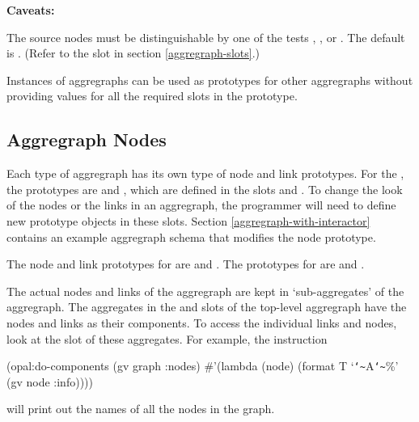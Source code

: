 {\bf Caveats:}

The source nodes must be distinguishable by one of the tests
, , or .  The default is .
(Refer to the  slot in section
\ref{aggregraph-slots}.)

Instances of aggregraphs can be used as prototypes for other aggregraphs
without providing values for all the required slots in the prototype.


\subsection{Aggregraph Nodes}
\label{node-slots}

Each type of aggregraph has its own type of node and link prototypes.  For the
, the prototypes are  and
, which are defined in the slots
 and .  To change the look of the nodes
or the links in an aggregraph, the programmer will need to define new
prototype objects in these slots.  Section \ref{aggregraph-with-interactor}
contains an example aggregraph schema that modifies the node prototype.

The node and link prototypes for  are
 and
.  The prototypes for
 are
 and
.

The actual nodes and links of the aggregraph are kept in `sub-aggregates' of
the aggregraph.  The aggregates in the  and  slots of
the top-level aggregraph have the nodes and links as their components.  To
access the individual links and nodes, look at the
 slot of these aggregates.  For example, the instruction
\begin{programexample}
(opal:do-components (gv graph :nodes)
                    \#'(lambda (node)
                        (format T `{\tt\char`\~}A{\tt\char`\~}\%' (gv node :info))))
\end{programexample}
will print out the names of all the nodes in the graph.


